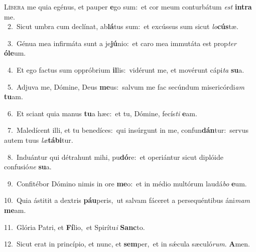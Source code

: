 \lettrine{\initial\textcolor{\initialcolor}{L}}{íbera} me quia egénus, et pauper \textbf{e}\-go sum:~\star et cor meum conturbátum \textit{est} \textbf{in}\-\textbf{tra} me.\\
{\numbfont\textcolor{\numbcolor}{~2.}}~Sicut umbra cum declínat, ab\-\textbf{lá}\-tus sum:~\star et excússus sum sicut \textit{lo}\-\textbf{cús}tæ.\par
{\numbfont\textcolor{\numbcolor}{~3.}}~Génua mea infirmáta sunt a je\-\textbf{jú}\-nio:~\star et caro mea immutáta est prop\textit{ter} \textbf{ó}\-\textbf{le}um.\par
{\numbfont\textcolor{\numbcolor}{~4.}}~Et ego factus sum oppróbrium \textbf{il}\-lis:~\star vidérunt me, et movérunt cápi\textit{ta} \textbf{su}\-a.\par
{\numbfont\textcolor{\numbcolor}{~5.}}~Adjuva me, Dómine, Deus \textbf{me}\-us:~\star salvum me fac secúndum misericórdi\textit{am} \textbf{tu}\-am.\par
{\numbfont\textcolor{\numbcolor}{~6.}}~Et sciant quia manus \textbf{tu}\-a hæc:~\star et tu, Dómine, fecís\textit{ti} \textbf{e}\-am.\par
{\numbfont\textcolor{\numbcolor}{~7.}}~Maledícent illi, et tu benedíces:~\dagger qui insúrgunt in me, confun\-\textbf{dán}\-tur:~\star servus autem tuus \textit{læ}\-\textbf{tá}\textbf{bi}tur.\par
{\numbfont\textcolor{\numbcolor}{~8.}}~Induántur qui détrahunt mihi, pu\-\textbf{dó}\-re:~\star et operiántur sicut diplóide confusió\textit{ne} \textbf{su}\-a.\par
{\numbfont\textcolor{\numbcolor}{~9.}}~Confitébor Dómino nimis in ore \textbf{me}\-o:~\star et in médio multórum laudá\textit{bo} \textbf{e}\-um.\par
{\numbfont\textcolor{\numbcolor}{10.}}~Quia ástitit a dextris \textbf{páu}\-peris,~\star ut salvam fáceret a persequéntibus áni\textit{mam} \textbf{me}\-am.\par
{\numbfont\textcolor{\numbcolor}{11.}}~Glória Patri, et \textbf{Fí}\-lio,~\star et Spirítu\textit{i} \textbf{Sanc}\-to.\par
{\numbfont\textcolor{\numbcolor}{12.}}~Sicut erat in princípio, et nunc, et \textbf{sem}\-per,~\star et in sǽcula sæculó\-\textit{rum}\-. \textbf{A}\-men.\par
